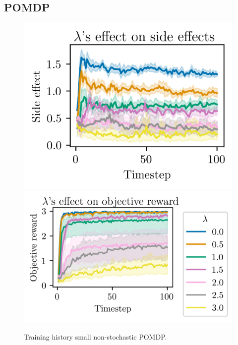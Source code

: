 \documentclass[12pt,A4]{report}
\theoremstyle{definition}
\begin{document}
\begin{appendices}
\section{POMDP }
\begin{figure}[H]
  \centering
  \includegraphics{"./figures/pomdp_8x8_side_effects.png"}
  \includegraphics{"./figures/pomdp_8x8_objective_reward.png"}
  \caption{Training history small non-stochastic POMDP.}
  \label{fig:results_static_8x8_stochastic}
\end{figure}


\end{appendices}
\end{document}
